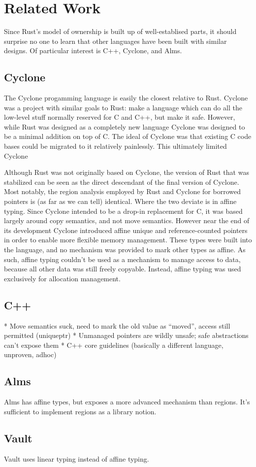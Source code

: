 \chapter{Related Work}
\label{ch:related}

Since Rust's model of ownership is built up of well-establised parts, it should
surprise no one to learn that other languages have been built with similar
designs. Of particular interest is C++, Cyclone, and Alms.


\section{Cyclone}

The Cyclone progamming language is easily the closest relative to Rust. Cyclone
was a project with similar goals to Rust: make a language which can do all the
low-level stuff normally reserved for C and C++, but make it safe. However, while
Rust was designed as a completely new language Cyclone was designed to be a
minimal addition on top of C. The ideal of Cyclone was that existing C code
bases could be migrated to it relatively painlessly. This ultimately limited
Cyclone

Although Rust was not originally based on Cyclone, the version of Rust that
was stabilized can be seen as the direct descendant of the final version of
Cyclone. Most notably, the region analysis employed by Rust and Cyclone for
borrowed pointers is (as far as we can tell) identical. Where the two deviate
is in affine typing. Since Cyclone intended to be a drop-in replacement for C,
it was based largely around copy semantics, and not move semantics. However
near the end of its development Cyclone introduced affine unique and
reference-counted pointers in order to enable more flexible memory management.
These types were built into the language, and no mechanism was provided to mark
other types as affine. As such, affine typing couldn't be used as a mechanism to
manage access to data, because all other data was still freely copyable. Instead,
affine typing was used exclusively for allocation management.



\section{C++}

* Move semantics suck, need to mark the old value as ``moved'', access still permitted (uniqueptr)
* Unmanaged pointers are wildly unsafe; safe abstractions can't expose them
* C++ core guidelines (basically a different language, unproven, adhoc)








\section{Alms}

Alms has affine types, but exposes a more advanced mechanism than regions. It's
sufficient to implement regions as a library notion.




\section{Vault}

Vault uses linear typing instead of affine typing.



